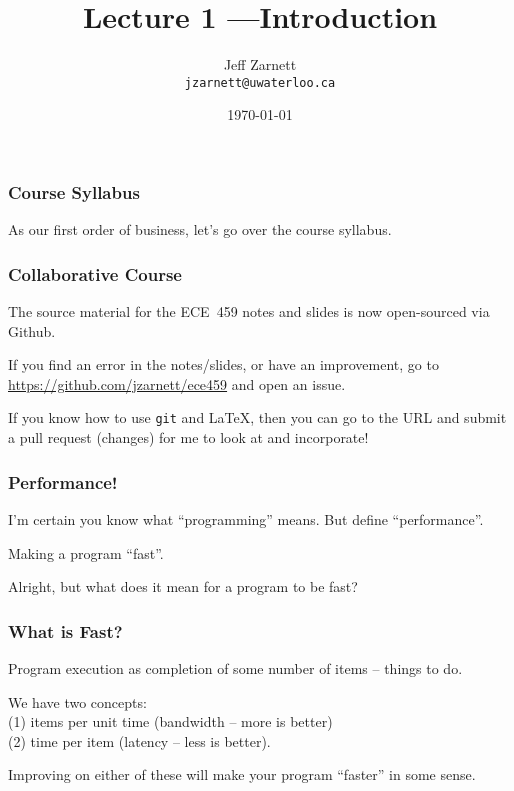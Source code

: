 

\title{Lecture 1 ---Introduction}

\author{Jeff Zarnett \\ \small \texttt{jzarnett@uwaterloo.ca}}
\date{\today}




\begin{frame}
  \titlepage

 \end{frame}

\begin{frame}
\frametitle{Course Syllabus}

As our first order of business, let's go over the course syllabus.

\end{frame}

\begin{frame}
\frametitle{Collaborative Course}

The source material for the ECE~459 notes and slides is now open-sourced via Github. 

If you find an error in the notes/slides, or have an improvement, go to \url{https://github.com/jzarnett/ece459} and open an issue. 

If you know how to use \texttt{git} and \LaTeX, then you can go to the URL and submit a pull request (changes) for me to look at and incorporate!

\end{frame}



\begin{frame}
\frametitle{Performance!}

I'm certain you know what ``programming'' means. But define ``performance''. 

Making a program ``fast''. 

Alright, but what does it mean for a program to be fast?


\end{frame}



\begin{frame}
\frametitle{What is Fast?}

Program execution as completion of some number of items -- things to do. 

We have two concepts:\\
\quad (1) items per unit time (bandwidth -- more is better)\\
\quad (2) time per item (latency -- less is better). 

Improving on either of these will make your program ``faster'' in some sense.

\end{frame}


